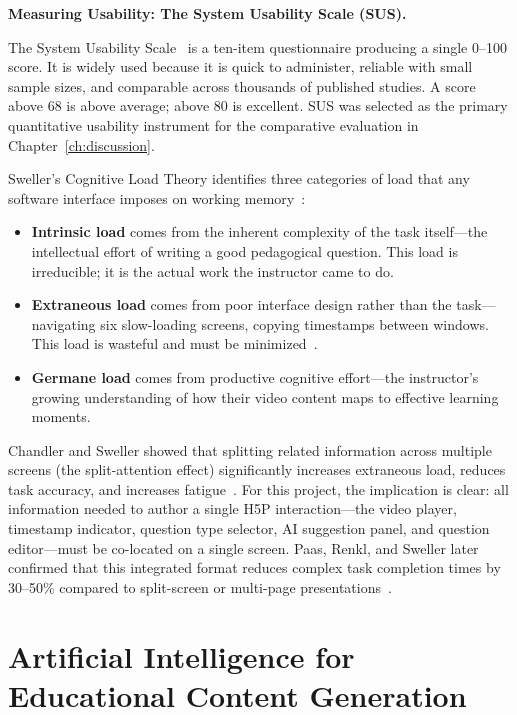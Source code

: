 \textbf{Measuring Usability: The System Usability Scale (SUS).}

The System Usability Scale~\cite{brooke1996} is a ten-item questionnaire producing a single 0--100 score. It is widely used because it is quick to administer, reliable with small sample sizes, and comparable across thousands of published studies. A score above 68 is above average; above 80 is excellent. SUS was selected as the primary quantitative usability instrument for the comparative evaluation in Chapter~\ref{ch:discussion}.

Sweller's Cognitive Load Theory identifies three categories of load that any software interface imposes on working memory~\cite{sweller1988}:

\begin{itemize}
  \item \textbf{Intrinsic load} comes from the inherent complexity of the task itself---the intellectual effort of writing a good pedagogical question. This load is irreducible; it is the actual work the instructor came to do.
  \item \textbf{Extraneous load} comes from poor interface design rather than the task---navigating six slow-loading screens, copying timestamps between windows. This load is wasteful and must be minimized~\cite{chandler1991}.
  \item \textbf{Germane load} comes from productive cognitive effort---the instructor's growing understanding of how their video content maps to effective learning moments.
\end{itemize}

Chandler and Sweller showed that splitting related information across multiple screens (the split-attention effect) significantly increases extraneous load, reduces task accuracy, and increases fatigue~\cite{chandler1991}. For this project, the implication is clear: all information needed to author a single H5P interaction---the video player, timestamp indicator, question type selector, AI suggestion panel, and question editor---must be co-located on a single screen. Paas, Renkl, and Sweller later confirmed that this integrated format reduces complex task completion times by 30--50\% compared to split-screen or multi-page presentations~\cite{paas2003}.

\section{Artificial Intelligence for Educational Content Generation}

